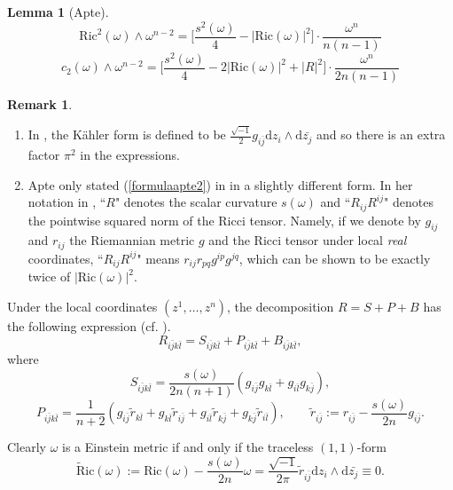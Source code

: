 \documentclass[11pt]{amsart}
\newtheorem{lemma}[theorem]{Lemma}
\theoremstyle{definition}
\newtheorem{remark}[theorem]{Remark}
\theoremstyle{remark}
\numberwithin{equation}{section}
\begin{document}
\begin{lemma}[Apte]\label{lemmaapte}
\begin{equation}\label{formulaapte1}\text{Ric}^2(\omega)\wedge\omega^{n-2}=
\big[\frac{s^2(\omega)}{4}-|\text{Ric}(\omega)|^2\big]\cdot\frac{\omega^n}{n(n-1)}\end{equation}
\begin{equation}\label{formulaapte2}c_2(\omega)\wedge\omega^{n-2}=
\big[\frac{s^2(\omega)}{4}-2|\text{Ric}(\omega)|^2+|R|^2\big]\cdot\frac{\omega^n}{2n(n-1)}\end{equation}
\end{lemma}

\begin{remark}~
\begin{enumerate}
\item
In \cite{Zh}, the K\"{a}hler form is defined to be
$\frac{\sqrt{-1}}{2}g_{i\bar{j}}\text{d}z_i\wedge\text{d}\bar{z_j}$
and so there is an extra factor $\pi^2$ in the expressions.

\item
Apte only stated (\ref{formulaapte2}) in \cite[p. 150]{Ap} in a
slightly different form. In her notation in \cite{Ap}, ``$R$"
denotes the scalar curvature $s(\omega)$ and ``$R_{ij}R^{ij}$"
denotes the pointwise squared norm of the Ricci tensor. Namely, if
we denote by $g_{ij}$ and $r_{ij}$ the Riemannian metric $g$ and the
Ricci tensor under local \emph{real} coordinates, ``$R_{ij}R^{ij}$"
means $r_{ij}r_{pq}g^{ip}g^{jq}$, which can be shown to be exactly
twice of $|\text{Ric}(\omega)|^2$.
\end{enumerate}
\end{remark}

 Under the local coordinates $(z^1,\ldots,z^n)$, the decomposition $R=S+P+B$ has the following expression (cf. \cite[p. 86]{Bo}).
$$R_{i\bar{j}k\bar{l}}=S_{i\bar{j}k\bar{l}}+P_{i\bar{j}k\bar{l}}+B_{i\bar{j}k\bar{l}},$$
where
$$S_{i\bar{j}k\bar{l}}=\frac{s(\omega)}{2n(n+1)}(g_{i\bar{j}}g_{k\bar{l}}+g_{i\bar{l}}g_{k\bar{j}}),
$$
$$P_{i\bar{j}k\bar{l}}=\frac{1}{n+2}
(g_{i\bar{j}}\tilde{r}_{k\bar{l}}+
g_{k\bar{l}}\tilde{r}_{i\bar{j}}+g_{i\bar{l}}
\tilde{r}_{k\bar{j}}+g_{k\bar{j}}\tilde{r}_{i\bar{l}}),\qquad
\tilde{r}_{i\bar{j}}:=r_{i\bar{j}}-\frac{s(\omega)}{2n}g_{i\bar{j}}.$$

Clearly $\omega$ is a Einstein metric if and only if the traceless
$(1,1)$-form
$$\tilde{\text{R}}\text{ic}(\omega):=
\text{Ric}(\omega)-\frac{s(\omega)}{2n}\omega=\frac{\sqrt{-1}}{2\pi}
\tilde{r}_{i\bar{j}}\text{d}z_i\wedge\text{d}\bar{z_j}\equiv0.$$
\end{document}

